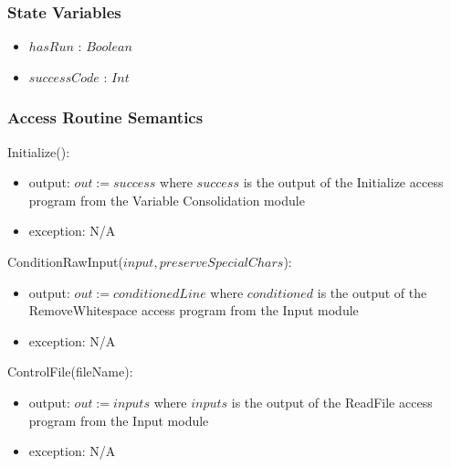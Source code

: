 \documentclass[12pt, titlepage]{article}
\begin{document}
\subsubsection{State Variables}

\begin{itemize}
	\item $hasRun$ : $Boolean$
	\item $successCode$ : $Int$
\end{itemize}

\subsubsection{Access Routine Semantics}

\noindent Initialize():
\begin{itemize}
	\item output: $out := success$ where $success$ is the output of the 
	Initialize access program from the Variable Consolidation module
	\item exception: N/A
\end{itemize}

\noindent ConditionRawInput($input, preserveSpecialChars$):
\begin{itemize}
	\item output: $out := conditionedLine$ where $conditioned$ is the output of 
	the RemoveWhitespace access program from the Input module
	\item exception: N/A
\end{itemize}

\noindent ControlFile(fileName):
\begin{itemize}
	\item output: $out := inputs$ where $inputs$ is the output of the 
	ReadFile access program from the Input module
	\item exception: N/A
\end{itemize}
\end{document}
